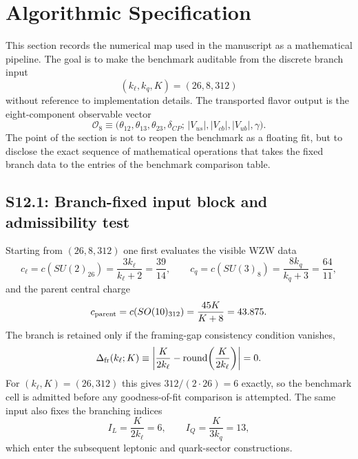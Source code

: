 \documentclass[11pt]{article}
\begin{document}
\section{Algorithmic Specification}

This section records the numerical map used in the manuscript as a mathematical
pipeline. The goal is to make the benchmark auditable from the discrete branch
input
\begin{equation}
 (k_{\ell},k_q,K)=(26,8,312)
\end{equation}
without reference to implementation details. The transported flavor output is
the eight-component observable vector
\begin{equation}
 \mathcal O_8
 \equiv
 \bigl(\theta_{12},\theta_{13},\theta_{23},\delta_{CP};\,|V_{us}|,|V_{cb}|,|V_{ub}|,\gamma\bigr).
\end{equation}
The point of the section is not to reopen the benchmark as a floating fit, but
to disclose the exact sequence of mathematical operations that takes the fixed
branch data to the entries of the benchmark comparison table.

\subsection*{S12.1: Branch-fixed input block and admissibility test}

Starting from $(26,8,312)$ one first evaluates the visible WZW data
\begin{equation}
 c_{\ell}=c\!\left(SU(2)_{26}\right)=\frac{3k_{\ell}}{k_{\ell}+2}=\frac{39}{14},
 \qquad
 c_q=c\!\left(SU(3)_8\right)=\frac{8k_q}{k_q+3}=\frac{64}{11},
\end{equation}
and the parent central charge
\begin{equation}
 c_{\rm parent}=c\!\left(SO(10)_{312}\right)=\frac{45K}{K+8}=43.875.
\end{equation}
The branch is retained only if the framing-gap consistency condition vanishes,
\begin{equation}
 \Delta_{\rm fr}(k_{\ell};K)
 \equiv
 \left|\frac{K}{2k_{\ell}}-\operatorname{round}\!\left(\frac{K}{2k_{\ell}}\right)\right|
 =0.
\end{equation}
For $(k_{\ell},K)=(26,312)$ this gives $312/(2\cdot 26)=6$ exactly, so the
benchmark cell is admitted before any goodness-of-fit comparison is attempted.
The same input also fixes the branching indices
\begin{equation}
 I_L=\frac{K}{2k_{\ell}}=6,
 \qquad
 I_Q=\frac{K}{3k_q}=13,
\end{equation}
which enter the subsequent leptonic and quark-sector constructions.
\end{document}

